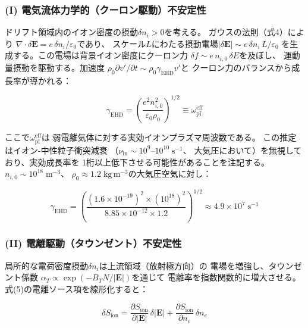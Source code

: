 \documentclass[12pt,twocolumn]{ltjsarticle}
\newcommand{\ee}{\mathbf{E}}
\begin{document}
\subsubsection{(I) 電気流体力学的（クーロン駆動）不安定性}

ドリフト領域内のイオン密度の摂動$\delta n_i > 0$を考える。
ガウスの法則（式4）により
$\nabla \cdot \delta\ee = e\,\delta n_i / \varepsilon_0$であり、
スケール$L$にわたる摂動電場$|\delta\ee| \sim e\,\delta n_i\,L / \varepsilon_0$
を生成する。この電場は背景イオン密度にクーロン力
$\delta f \sim e\,n_{i,0}\,\delta E$を及ぼし、
運動量摂動を駆動する。加速度
$\rho_0 \partial v' / \partial t \sim \rho_0 \gamma_{\mathrm{EHD}} v'$と
クーロン力のバランスから成長率が導かれる：

\begin{equation}
  \gamma_{\mathrm{EHD}}
  = \left(\frac{e^2 n_{i,0}^2}{\varepsilon_0 \rho_0}\right)^{1/2}
  \equiv \omega_{\mathrm{pi}}^{\mathrm{eff}}
  \label{eq:gamma_EHD}
\end{equation}

ここで$\omega_{\mathrm{pi}}^{\mathrm{eff}}$は
弱電離気体に対する実効イオンプラズマ周波数である。
この推定はイオン-中性粒子衝突減衰
（$\nu_{\mathrm{in}} \sim 10^{9}$--$10^{10}\;\mathrm{s^{-1}}$、
大気圧において）を無視しており、実効成長率を
1桁以上低下させる可能性があることを注記する。
$n_{i,0} \sim 10^{18}\;\mathrm{m^{-3}}$、
$\rho_0 \approx 1.2\;\mathrm{kg\,m^{-3}}$の大気圧空気に対し：

\begin{equation}
  \gamma_{\mathrm{EHD}}
  = \left(
    \frac{(1.6 \times 10^{-19})^2 \times (10^{18})^2}
         {8.85 \times 10^{-12} \times 1.2}
  \right)^{1/2}
  \approx 4.9 \times 10^7\;\mathrm{s^{-1}}
  \label{eq:gamma_EHD_num}
\end{equation}

\subsubsection{(II) 電離駆動（タウンゼント）不安定性}

局所的な電荷密度摂動$\delta n_i$は上流領域（放射極方向）の
電場を増強し、タウンゼント係数
$\alpha_T \propto \exp(-B_T N / |\ee|)$を通じて
電離率を指数関数的に増大させる。
式(5)の電離ソース項を線形化すると：

\begin{equation}
  \delta S_{\mathrm{ion}}
  = \frac{\partial S_{\mathrm{ion}}}{\partial |\ee|}\,\delta|\ee|
  + \frac{\partial S_{\mathrm{ion}}}{\partial n_e}\,\delta n_e
  \label{eq:ionization_perturbation}
\end{equation}
\end{document}

